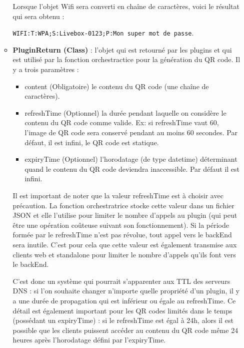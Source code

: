 \documentclass[a4paper,12pt]{article}
\begin{document}
\begin{itemize}
\begin{itemize}
        Lorsque l'objet Wifi sera converti en chaîne de caractères, voici le résultat qui sera obtenu :
        
        \verb|WIFI:T:WPA;S:Livebox-0123;P:Mon super mot de passe|.\\
        
        \item \textbf{PluginReturn (Class)} : l'objet qui est retourné par les plugins et qui est utilisé par la fonction orchestractice pour la génération du QR code. Il y a trois paramètres : 
        \begin{itemize}
            \item content (Obligatoire) le contenu du QR code (une chaîne de caractères).
            \item refreshTime (Optionnel) la durée pendant laquelle on considère le contenu du QR code comme valide. Ex: si refreshTime vaut 60, l'image de QR code sera conservé pendant au moins 60 secondes. Par défaut, il est infini, le QR code est statique.
            \item expiryTime (Optionnel) l'horodatage (de type datetime) déterminant quand le contenu du QR code deviendra inaccessible. Par défaut il est infini.
        \end{itemize}
        
        Il est important de noter que la valeur refreshTime est à choisir avec précaution. La fonction orchestratrice stocke cette valeur dans un fichier JSON et elle l'utilise pour limiter le nombre d'appels au plugin (qui peut être une opération coûteuse suivant son fonctionnement). Si la période formée par le refreshTime n'est pas révolue, tout appel vers le backEnd sera inutile. C'est pour cela que cette valeur est également transmise aux clients web et standalone pour limiter le nombre d'appels qu'ils font vers le backEnd.
        
        C'est donc un système qui pourrait s'apparenter aux TTL des serveurs DNS : si l'on souhaite changer n'importe quelle propriété d'un plugin, il y a une durée de propagation qui est inférieur ou égale au refreshTime. Ce détail est également important pour les QR codes limités dans le temps (possédant un expiryTime) : si le refreshTime est égal à 24h, alors il est possible que les clients puissent accéder au contenu du QR code même 24 heures après l'horodatage défini par l'expiryTime.\\
        
    \end{itemize}
\end{itemize}
\end{document}
